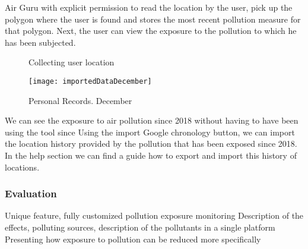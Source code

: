 Air Guru with explicit permission to read the location by the user, pick up the polygon where
the user is found and stores the most recent pollution measure for that polygon. Next, the
user can view the exposure to the pollution to which he has been subjected.
\newpage
\begin{figure}[ht]
    \centering 
      \caption{Collecting user location}
    \end{figure}
    \begin{figure}[ht]
        \centering
        \texttt{[image: importedDataDecember]}
        \caption{Personal Records. December}
    \end{figure}
    We can see the exposure to air pollution since 2018 without having to have been using the tool since
    Using the import Google chronology button, we can import the location history provided by the
    pollution that has been exposed since 2018. In the help section we can find a guide how to
    export and import this history of locations.
\subsubsection*{Evaluation}  
\begin{itemize}
    \done Unique feature, fully customized pollution exposure monitoring
    \done Description of the effects, polluting sources, description of the pollutants in a single platform
    \crossed Presenting how exposure to pollution can be reduced more specifically
    
\end{itemize}